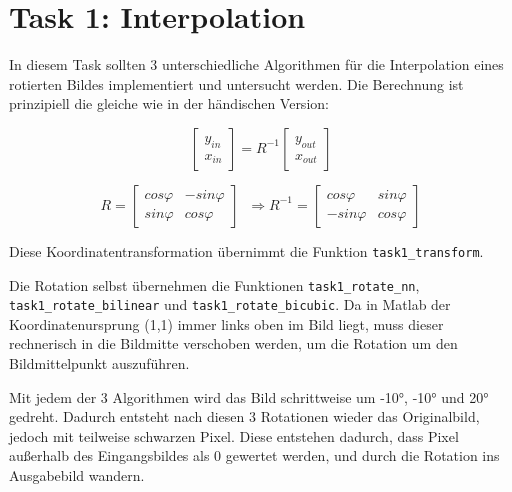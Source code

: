 
\chapter{Task 1: Interpolation}

In diesem Task sollten 3 unterschiedliche Algorithmen für die Interpolation eines rotierten Bildes implementiert und untersucht werden. Die Berechnung ist prinzipiell die gleiche wie in der händischen Version:

\begin{equation}
 \begin{bmatrix} y_{in} \\ x_{in} \end{bmatrix} = R^{-1} \begin{bmatrix} y_{out} \\ x_{out} \end{bmatrix}
\end{equation}

\begin{equation}
 R = \begin{bmatrix} cos \varphi & -sin \varphi \\ sin \varphi & cos \varphi \end{bmatrix} \; \; \Rightarrow R^{-1} = \begin{bmatrix} cos \varphi & sin \varphi \\ -sin \varphi & cos \varphi \end{bmatrix}
\end{equation}

Diese Koordinatentransformation übernimmt die Funktion \texttt{task1\_transform}.

Die Rotation selbst übernehmen die Funktionen \texttt{task1\_rotate\_nn}, \texttt{task1\_rotate\_bilinear} und \texttt{task1\_rotate\_bicubic}.
Da in Matlab der Koordinatenursprung (1,1) immer links oben im Bild liegt, muss dieser rechnerisch in die Bildmitte verschoben werden, um die Rotation um den Bildmittelpunkt auszuführen.

Mit jedem der 3 Algorithmen wird das Bild schrittweise um -10°, -10° und 20° gedreht. Dadurch entsteht nach diesen 3 Rotationen wieder das Originalbild, jedoch mit teilweise schwarzen Pixel. Diese entstehen dadurch, dass Pixel außerhalb des Eingangsbildes als 0 gewertet werden, und durch die Rotation ins Ausgabebild wandern.

